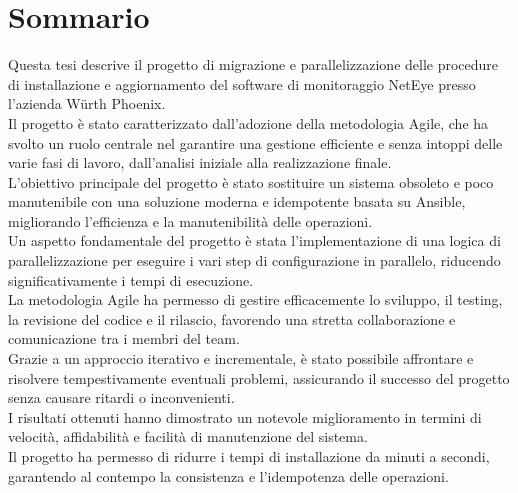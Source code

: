 \chapter*{Sommario}
\label{cha:sommario}

Questa tesi descrive il progetto di migrazione e parallelizzazione delle
procedure di installazione e aggiornamento del software di monitoraggio NetEye
presso l'azienda Würth Phoenix.\\ Il progetto è stato caratterizzato dall'adozione
della metodologia Agile, che ha svolto un ruolo centrale nel garantire una gestione
efficiente e senza intoppi delle varie fasi di lavoro, dall'analisi iniziale
alla realizzazione finale.\\ L'obiettivo principale del progetto è stato
sostituire un sistema obsoleto e poco manutenibile con una soluzione moderna e
idempotente basata su Ansible, migliorando l'efficienza e la manutenibilità delle
operazioni.\\ Un aspetto fondamentale del progetto è stata l'implementazione di una
logica di parallelizzazione per eseguire i vari step di configurazione in parallelo,
riducendo significativamente i tempi di esecuzione.\\ La metodologia Agile ha
permesso di gestire efficacemente lo sviluppo, il testing, la revisione del
codice e il rilascio, favorendo una stretta collaborazione e comunicazione tra i
membri del team.\\ Grazie a un approccio iterativo e incrementale, è stato
possibile affrontare e risolvere tempestivamente eventuali problemi, assicurando
il successo del progetto senza causare ritardi o inconvenienti.\\ I risultati ottenuti
hanno dimostrato un notevole miglioramento in termini di velocità, affidabilità
e facilità di manutenzione del sistema.\\ Il progetto ha permesso di ridurre i
tempi di installazione da minuti a secondi, garantendo al contempo la consistenza
e l'idempotenza delle operazioni.
